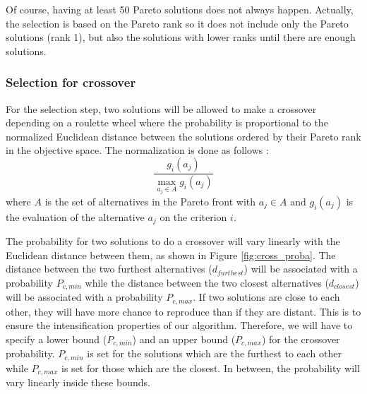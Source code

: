 Of course, having at least 50 Pareto solutions does not always happen. Actually, the selection is based on the Pareto rank so it does not include only the Pareto solutions (rank 1), but also the solutions with lower ranks until there are enough solutions.

\subsubsection{Selection for crossover}
For the selection step, two solutions will be allowed to make a crossover depending on a roulette wheel where the probability is proportional to the normalized Euclidean distance between the solutions ordered by their Pareto rank in the objective space. The normalization is done as follows :
\begin{equation}
\frac{g_i(a_j)}{\max\limits_{a_j \in A} g_i(a_j)}
\end{equation}
where $A$ is the set of alternatives in the Pareto front with $a_j \in A$ and $g_i(a_j)$ is the evaluation of the alternative $a_j$ on the criterion $i$.


The probability for two solutions to do a crossover will vary linearly with the Euclidean distance between them, as shown in Figure \ref{fig:cross_proba}. The distance between the two furthest alternatives ($d_{furthest}$) will be associated with a probability $P_{c, min}$ while the distance between the two closest alternatives ($d_{closest}$) will be associated with a probability $P_{c, max}$. If two solutions are close to each other, they will have more chance to reproduce than if they are distant. This is to ensure the intensification properties of our algorithm. Therefore, we will have to specify a lower bound ($P_{c, min}$) and an upper bound ($P_{c, max}$) for the crossover probability. $P_{c, min}$ is set for the solutions which are the furthest to each other while $P_{c, max}$ is set for those which are the closest. In between, the probability will vary linearly inside these bounds.

